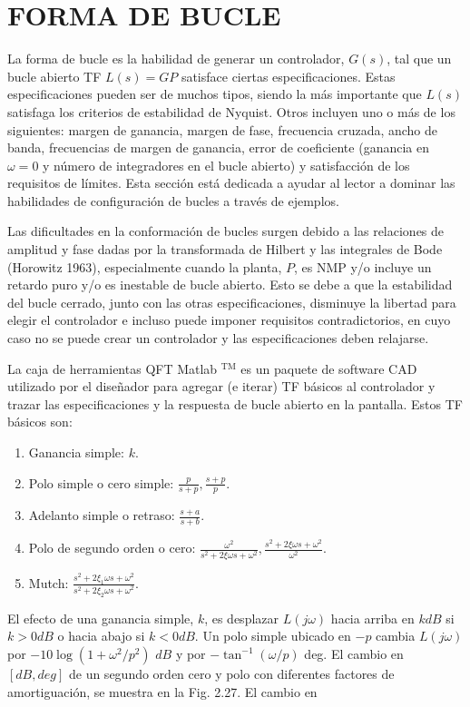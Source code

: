 \section{FORMA DE BUCLE}
La forma de bucle es la habilidad de generar un controlador, $G(s)$, tal que un bucle abierto TF $L(s)=G P$ satisface ciertas especificaciones. Estas especificaciones pueden ser de muchos tipos, siendo la más importante que $L(s)$ satisfaga los criterios de estabilidad de Nyquist. Otros incluyen uno o más de los siguientes: margen de ganancia, margen de fase, frecuencia cruzada, ancho de banda, frecuencias de margen de ganancia, error de coeficiente (ganancia en $\omega=0$ y número de integradores en el bucle abierto) y satisfacción de los requisitos de límites. Esta sección está dedicada a ayudar al lector a dominar las habilidades de configuración de bucles a través de ejemplos.

Las dificultades en la conformación de bucles surgen debido a las relaciones de amplitud y fase dadas por la transformada de Hilbert y las integrales de Bode (Horowitz 1963), especialmente cuando la planta, $P$, es NMP y/o incluye un retardo puro y/o es inestable de bucle abierto. Esto se debe a que la estabilidad del bucle cerrado, junto con las otras especificaciones, disminuye la libertad para elegir el controlador e incluso puede imponer requisitos contradictorios, en cuyo caso no se puede crear un controlador y las especificaciones deben relajarse.

La caja de herramientas QFT Matlab ${ }^{\mathrm{TM}}$ es un paquete de software CAD utilizado por el diseñador para agregar (e iterar) TF básicos al controlador y trazar las especificaciones y la respuesta de bucle abierto en la pantalla. Estos TF básicos son:

\begin{enumerate}
  \item Ganancia simple: $k$.

  \item Polo simple o cero simple: $\frac{p}{s+p}, \frac{s+p}{p}$.

  \item Adelanto simple o retraso: $\frac{s+a}{s+b}$.

  \item Polo de segundo orden o cero: $\frac{\omega^{2}}{s^{2}+2 \xi \omega s+\omega^{2}}, \frac{s^{2}+2 \xi \omega s+\omega^{2}}{\omega^{2}}$.

  \item Mutch: $\frac{s^{2}+2 \xi_{1} \omega s+\omega^{2}}{s^{2}+2 \xi_{2} \omega s+\omega^{2}}$.

\end{enumerate}
El efecto de una ganancia simple, $k$, es desplazar $L(j \omega)$ hacia arriba en $k d B$ si $k>0 d B$ o hacia abajo si $k<0 d B$. Un polo simple ubicado en $-p$ cambia $L(j \omega)$ por $-10 \log \left(1+\omega^{2} / p^{2}\right)$ $d B$ y por $-\tan ^{-1}(\omega / p)$ deg. El cambio en $[d B, d e g]$ de un segundo orden cero y polo con diferentes factores de amortiguación, se muestra en la Fig. 2.27. El cambio en

